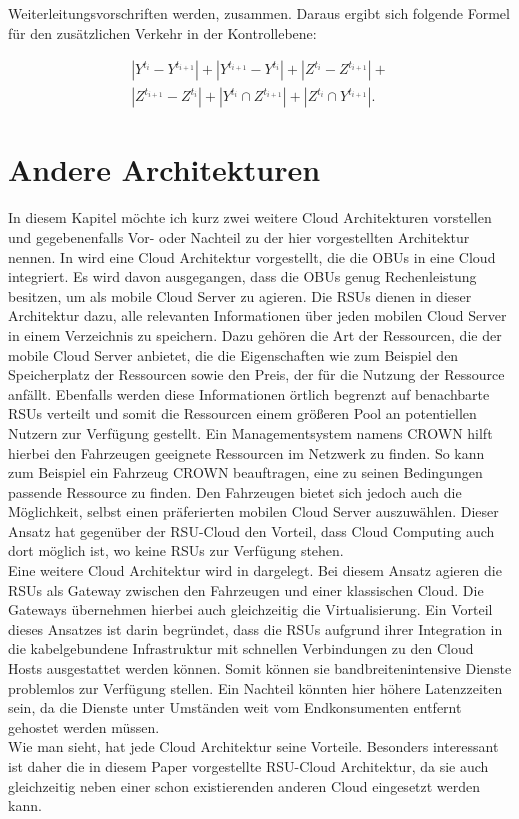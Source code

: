 \documentclass[conference]{IEEEtran}
\begin{document}
Weiterleitungsvorschriften werden, zusammen. Daraus ergibt sich folgende Formel für den zusätzlichen Verkehr in der Kontrollebene: 

\begin{equation}
\begin{split}
 |Y^{t_i}-Y^{t_{i+1}}|+|Y^{t_{i+1}}-Y^{t_{i}}|+|Z^{t_i}-Z^{t_{i+1}}|+ \\|Z^{t_{i+1}}-Z^{t_{i}}|+|Y^{t_i} \cap Z^{t_{i+1}}|+|Z^{t_{i}} \cap Y^{t_{i+1}}|.
 \end{split}
\end{equation}


\section{Andere Architekturen}

In diesem Kapitel möchte ich kurz zwei weitere Cloud Architekturen vorstellen und gegebenenfalls Vor- oder Nachteil zu der hier vorgestellten Architektur nennen. In \cite{IEEEhowto:star} wird eine Cloud Architektur vorgestellt, die die OBUs in eine Cloud integriert. Es wird davon ausgegangen, dass die OBUs genug Rechenleistung besitzen, um als mobile Cloud Server zu agieren. Die RSUs dienen in dieser Architektur dazu, alle relevanten Informationen über jeden mobilen Cloud Server in einem Verzeichnis zu speichern. Dazu gehören die Art der Ressourcen, die der mobile Cloud Server anbietet, die die Eigenschaften wie zum Beispiel den Speicherplatz der Ressourcen sowie den Preis, der für die Nutzung der Ressource anfällt. Ebenfalls werden diese Informationen örtlich begrenzt auf benachbarte RSUs verteilt und somit die Ressourcen einem größeren Pool an potentiellen Nutzern zur Verfügung gestellt. Ein Managementsystem namens CROWN hilft hierbei den Fahrzeugen geeignete Ressourcen im Netzwerk zu finden. So kann zum Beispiel ein Fahrzeug CROWN beauftragen, eine zu seinen Bedingungen passende Ressource zu finden. Den Fahrzeugen bietet sich jedoch auch die Möglichkeit, selbst einen präferierten mobilen Cloud Server auszuwählen. Dieser Ansatz hat gegenüber der RSU-Cloud den Vorteil, dass Cloud Computing auch dort möglich ist, wo keine RSUs zur Verfügung stehen.\\
Eine weitere Cloud Architektur wird in \cite{IEEEhowto:rethinking} dargelegt. Bei diesem Ansatz agieren die RSUs als Gateway zwischen den Fahrzeugen und einer klassischen Cloud. Die Gateways übernehmen hierbei auch gleichzeitig die Virtualisierung. Ein Vorteil dieses Ansatzes ist darin begründet, dass die RSUs aufgrund ihrer Integration in die kabelgebundene Infrastruktur mit schnellen Verbindungen zu den Cloud Hosts ausgestattet werden können. Somit können sie bandbreitenintensive Dienste problemlos zur Verfügung stellen. Ein Nachteil könnten hier höhere Latenzzeiten sein, da die Dienste unter Umständen weit vom Endkonsumenten entfernt gehostet werden müssen.\\
Wie man sieht, hat jede Cloud Architektur seine Vorteile. Besonders interessant ist daher die in diesem Paper vorgestellte RSU-Cloud Architektur, da sie auch gleichzeitig neben einer schon existierenden anderen Cloud eingesetzt werden kann. 
\end{document}
